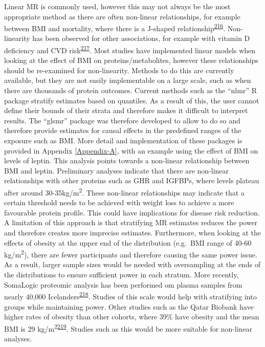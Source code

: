 \documentclass[11pt,twoside]{bristolthesis}
\begin{document}
Linear MR is commonly used, however this may not always be the most appropriate method as there are often non-linear relationships, for example between BMI and mortality, where there is a J-shaped relationship\textsuperscript{\protect\hyperlink{ref-Sun2019}{216}}. Non-linearity has been observed for other associations, for example with vitamin D deficiency and CVD risk\textsuperscript{\protect\hyperlink{ref-Zhou2021}{217}}. Most studies have implemented linear models when looking at the effect of BMI on proteins/metabolites, however these relationships should be re-examined for non-linearity. Methods to do this are currently available, but they are not easily implementable on a large scale, such as when there are thousands of protein outcomes. Current methods such as the ``nlmr'' R package stratify estimates based on quantiles. As a result of this, the user cannot define their bounds of their strata and therefore makes it difficult to interpret results. The ``glsmr'' package was therefore developed to allow to do so and therefore provide estimates for causal effects in the predefined ranges of the exposure such as BMI. More detail and implementation of these packages is provided in Appendix \ref{Appendix-A}, with an example using the effect of BMI on levels of leptin. This analysis points towards a non-linear relationship between BMI and leptin. Preliminary analyses indicate that there are non-linear relationships with other proteins such as GHR and IGFBPs, where levels plateau after around 30-35kg/m\textsuperscript{2}. These non-linear relationships may indicate that a certain threshold needs to be achieved with weight loss to achieve a more favourable protein profile. This could have implications for disease risk reduction.
A limitation of this approach is that stratifying MR estimates reduces the power and therefore creates more imprecise estimates. Furthermore, when looking at the effects of obesity at the upper end of the distribution (e.g.~BMI range of 40-60 kg/m\textsuperscript{2}), there are fewer participants and therefore causing the same power issue. As a result, larger sample sizes would be needed with oversampling at the ends of the distributions to ensure sufficient power in each stratum. More recently, SomaLogic proteomic analysis has been performed om plasma samples from nearly 40,000 Icelanders\textsuperscript{\protect\hyperlink{ref-Ferkingstad2021}{218}}. Studies of this scale would help with stratifying into groups while maintaining power. Other studies such as the Qatar Biobank have higher rates of obesity than other cohorts, where 39\% have obesity and the mean BMI is 29 kg/m\textsuperscript{2}\textsuperscript{\protect\hyperlink{ref-AlKuwari2015}{219}}. Studies such as this would be more suitable for non-linear analyses.
\end{document}
